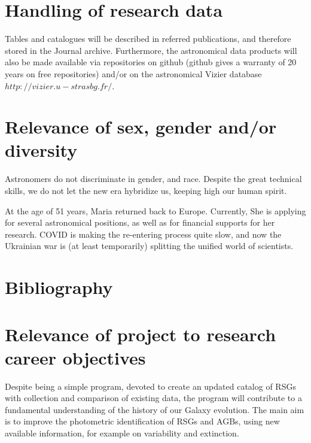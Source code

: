\documentclass[final,11pt,onecolumn,a4paper,twoside]{scrbook_gj}
\begin{document}




\section{Handling of research data}
Tables and catalogues will be described in referred
publications, and therefore stored in the Journal archive.
Furthermore, the astronomical data products  will also
be made available via repositories on  github 
(github gives a warranty of 20 years on free repositories)
and/or on the astronomical Vizier database
$http://vizier.u-strasbg.fr/$.

\section{Relevance of sex, gender and/or diversity}

Astronomers do not discriminate in gender, and race.  
Despite the great technical skills,  we do not let the new 
era hybridize us, keeping high our human spirit.

At the age of 51 years, Maria  returned back to 
Europe. 
Currently, She is applying for 
several astronomical positions, as well as for 
financial supports for her research. 
COVID  is making the 
re-entering process quite slow, and  now the 
Ukrainian war is (at least temporarily) splitting
the unified world of scientists.


\section{Bibliography}  		     



\section{Relevance of project to research career objectives}

Despite being a simple program, devoted to create an
updated catalog of RSGs with collection and 
comparison of existing data, the program will
contribute to a fundamental understanding
of the history of our Galaxy evolution.
The main aim is to improve the photometric identification
of RSGs and AGBs, using  new available
information, for example  on variability and extinction.
\end{document}

